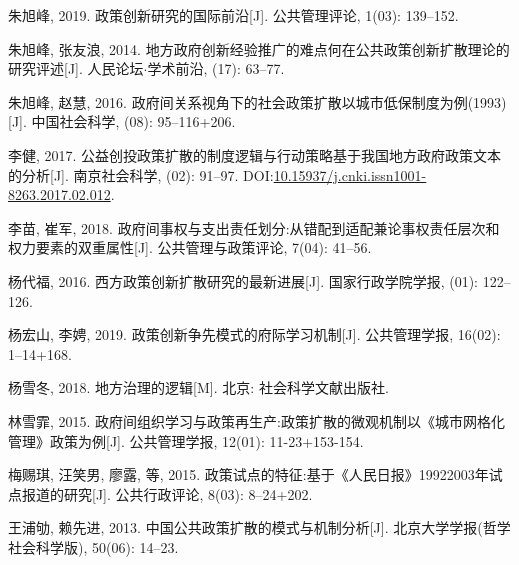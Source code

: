\documentclass[
  12pt,
]{ctexart}
\newlength{\cslhangindent}
\newlength{\cslentryspacingunit} %
\newenvironment{CSLReferences}[2] %
 {%
  \setlength{\parindent}{0pt}
  \ifodd #1
  \let\oldpar\par
  \def\par{\hangindent=\cslhangindent\oldpar}
  \fi
  \setlength{\parskip}{#2\cslentryspacingunit}
 }%
 {}
\begin{document}
\begin{CSLReferences}{1}{0}
\leavevmode{}%
朱旭峰, 2019. {政策创新研究的国际前沿}{[}J{]}. 公共管理评论, 1(03): 139--152.

\leavevmode{}%
朱旭峰, 张友浪, 2014. {地方政府创新经验推广的难点何在\textemdash\textemdash 公共政策创新扩散理论的研究评述}{[}J{]}. 人民论坛{\(\cdot\)}学术前沿, (17): 63--77.

\leavevmode{}%
朱旭峰, 赵慧, 2016. {政府间关系视角下的社会政策扩散\textemdash\textemdash 以城市低保制度为例(1993)}{[}J{]}. 中国社会科学, (08): 95--116+206.

\leavevmode{}%
李健, 2017. {公益创投政策扩散的制度逻辑与行动策略\textemdash\textemdash 基于我国地方政府政策文本的分析}{[}J{]}. 南京社会科学, (02): 91--97. DOI:\href{https://doi.org/10.15937/j.cnki.issn1001-8263.2017.02.012}{10.15937/j.cnki.issn1001-8263.2017.02.012}.

\leavevmode{}%
李苗, 崔军, 2018. {政府间事权与支出责任划分:从错配到适配\textemdash\textemdash 兼论事权责任层次和权力要素的双重属性}{[}J{]}. 公共管理与政策评论, 7(04): 41--56.

\leavevmode{}%
杨代福, 2016. {西方政策创新扩散研究的最新进展}{[}J{]}. 国家行政学院学报, (01): 122--126.

\leavevmode{}%
杨宏山, 李娉, 2019. {政策创新争先模式的府际学习机制}{[}J{]}. 公共管理学报, 16(02): 1--14+168.

\leavevmode{}%
杨雪冬, 2018. {地方治理的逻辑}{[}M{]}. {北京}: {社会科学文献出版社}.

\leavevmode{}%
林雪霏, 2015. {政府间组织学习与政策再生产:政策扩散的微观机制\textemdash\textemdash 以{《城市网格化管理》}政策为例}{[}J{]}. 公共管理学报, 12(01): 11-23+153-154.

\leavevmode{}%
梅赐琪, 汪笑男, 廖露, 等, 2015. {政策试点的特征:基于《人民日报》1992\textemdash 2003年试点报道的研究}{[}J{]}. 公共行政评论, 8(03): 8--24+202.

\leavevmode{}%
王浦劬, 赖先进, 2013. {中国公共政策扩散的模式与机制分析}{[}J{]}. 北京大学学报(哲学社会科学版), 50(06): 14--23.


\end{CSLReferences}
\end{document}
